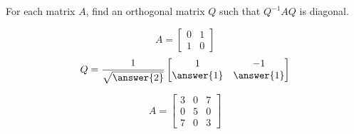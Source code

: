\documentclass{ximera}
\begin{document}
\begin{problem}\label{prob:findQ}
For each matrix $A$, find an orthogonal matrix $Q$ such that $Q^{-1}AQ$ is diagonal.

\begin{question}
$$A = \begin{bmatrix}
0 & 1 \\
1 & 0
\end{bmatrix}$$
$$Q=\frac{1}{\sqrt{\answer{2}}}\begin{bmatrix}1 & -1\\\answer{1} & \answer{1}\end{bmatrix}$$
\end{question}

\begin{question}
    $$A = \begin{bmatrix}
3 & 0 & 7 \\
0 & 5 & 0 \\
7 & 0 & 3
\end{bmatrix}$$
\end{question}



\end{problem}
\end{document}
